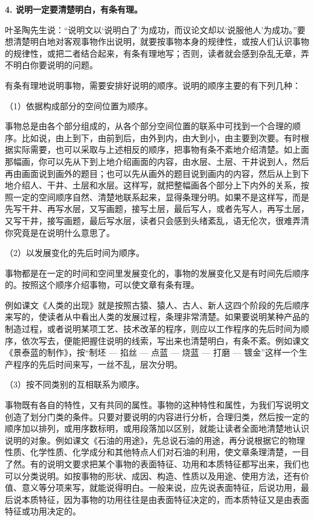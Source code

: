 \textbf{4. 说明一定要清楚明白，有条有理。}

叶圣陶先生说：“说明文以‘说明白了’为成功，而议论文却以‘说服他人’为成功。”要想清楚明白地对客观事物作出说明，就要按事物本身的规律性，或按人们认识事物的规律性，或把二者结合起来，有条有理地写；否则，读者就会感到杂乱无章，弄不明白你要说明的问题。

有条有理地说明事物，需要安排好说明的顺序。说明的顺序主要的有下列几种：

（1）依据构成部分的空间位置为顺序。

事物总是由各个部分组成的，从各个部分空间位置的联系中可找到一个合理的顺序。比如说，由上到下，由前到后，由外到内，由大到小，由主要到次要。有时根据实际需要，也可以采取与上述相反的顺序，把事物有条不紊地介绍清楚。如上面那幅画，你可以先从下到上地介绍画面的内容，由水层、土层、干井说到人，然后再由画面说到画外的题目；也可以先从画外的题目说到画内的内容，然后从上到下地介绍人、干井、土层和水层。这样写，就把整幅画各个部分上下内外的关系，按照一定的空间顺序自然、清楚地联系起来，显得条理分明。如果不是这样写，而是先写干井、再写水层，又写画题，接写土层，最后写人，或者先写人，再写土层，又写干井，接写画题，最后写水层，读者只会感到头绪紊乱，语无伦次，很难弄清你究竟是在说明什么意思了。

（2）以发展变化的先后时间为顺序。

事物都是在一定的时间和空间里发展变化的，事物的发展变化又是有时间先后顺序的。按照这个顺序介绍事物，可以使文章有条有理。

例如课文《人类的出现》就是按照古猿、猿人、古人、新人这四个阶段的先后顺序来写的，使读者从中看出人类的发展过程，条理非常清楚。如果要说明某种产品的制造过程，或者说明某项工艺、技术改革的程序，则应以工作程序的先后时间为顺序，依次写去，便能把握住说明的线索，写出来也清楚明白，有条不紊。例如课文《景泰蓝的制作》，按“制坯 --- 掐丝 --- 点蓝 --- 烧蓝 --- 打磨 --- 镀金”这样一个生产程序的先后时间来写，一丝不乱，层次分明。

（3）按不同类别的互相联系为顺序。

事物既有各自的特性，又有共同的属性。事物的这种特性和属性，为我们写说明文创造了划分门类的条件。只要对要说明的内容进行分析，合理归类，然后按一定的顺序加以排列，或用序数标明，或用段落加以区别，就能让读者全面地清楚地认识说明的对象。例如课文《石油的用途》，先总说石油的用途，再分说根据它的物理性质、化学性质、化学成分和其他特点人们对石油的利用，使文章条理清楚，一目了然。有的说明文要求把某个事物的表面特征、功用和本质特征都写出来，我们也可以分类说明。如按事物的形状、成因、构造、性质以及用途、使用方法，还有价值、意义等分项来写，就能说得明白。一般来说，应先说表面特征，后说功用，最后说本质特征，因为事物的功用往往是由表面特征决定的，而本质特征又是由表面特征或功用决定的。


